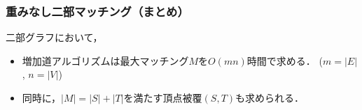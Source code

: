 \documentclass[14pt,aspectratio=169,xcolor=dvipsnames,table,onlytextwidth,dvipdfmx]{beamer}
\begin{document}
\begin{frame}
    \frametitle{重みなし二部マッチング（まとめ）}

    \begin{theorem}
        二部グラフにおいて，
        \begin{itemize}
            \setlength{\itemsep}{1em}
            \item 増加道アルゴリズムは最大マッチング$M$を$O(mn)$時間で求める． \hfill {\footnotesize ($m = |E|$, $n = |V|$)}

            \item 同時に，$|M| = |S| + |T|$を満たす頂点被覆$(S,T)$も求められる．
        \end{itemize}
    \end{theorem}
\end{frame}

\end{document}
